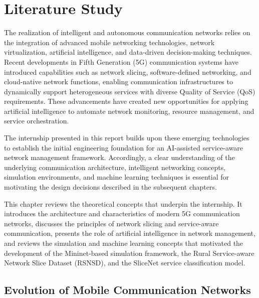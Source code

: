 \documentclass[12pt,a4paper]{report}
\begin{document}
	


	
	
	\chapter{Literature Study}
	\label{chap:background}
	
	The realization of intelligent and autonomous communication networks relies on the integration of advanced mobile networking technologies, network virtualization, artificial intelligence, and data-driven decision-making techniques. Recent developments in Fifth Generation (5G) communication systems have introduced capabilities such as network slicing, software-defined networking, and cloud-native network functions, enabling communication infrastructures to dynamically support heterogeneous services with diverse Quality of Service (QoS) requirements. These advancements have created new opportunities for applying artificial intelligence to automate network monitoring, resource management, and service orchestration.
	
	The internship presented in this report builds upon these emerging technologies to establish the initial engineering foundation for an AI-assisted service-aware network management framework. Accordingly, a clear understanding of the underlying communication architecture, intelligent networking concepts, simulation environments, and machine learning techniques is essential for motivating the design decisions described in the subsequent chapters.
	
	This chapter reviews the theoretical concepts that underpin the internship. It introduces the architecture and characteristics of modern 5G communication networks, discusses the principles of network slicing and service-aware communication, presents the role of artificial intelligence in network management, and reviews the simulation and machine learning concepts that motivated the development of the Mininet-based simulation framework, the Rural Service-aware Network Slice Dataset (RSNSD), and the SliceNet service classification model.
	
	
	\section{Evolution of Mobile Communication Networks}
	\label{sec:evolution}
	
\end{document}
